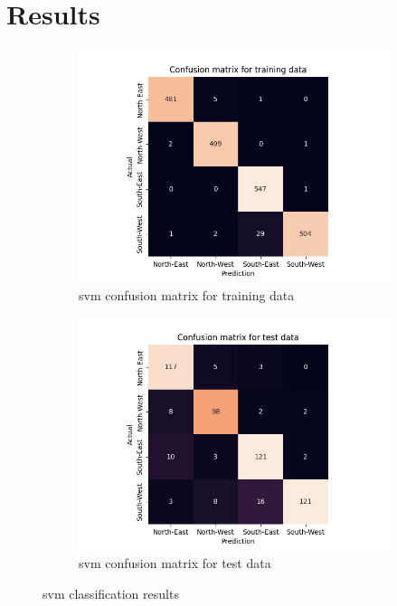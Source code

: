 \documentclass[10pt,twocolumn,letterpaper]{article}
\begin{document}
\section{Results}
\label{sec:results}

\begin{figure}
  \centering
  \begin{subfigure}{.33\linewidth}
    \includegraphics[width=\linewidth, trim={7em, 0em, 9em, 5em}, clip]{svm_cfsn_train}
    \caption{\acrshort{svm} confusion matrix for training data}
    \label{fig:svm_train}
  \end{subfigure}
  \begin{subfigure}{0.33\linewidth}
    \includegraphics[width=\linewidth, trim={7em, 0em, 9em, 5em}, clip]{svm_cfsn_test}
    \caption{\acrshort{svm} confusion matrix for test data}
    \label{fig:svm_test}
  \end{subfigure}
  \caption{\acrlong{svm} classification results}
  \label{fig:svm_res}
\end{figure}
\end{document}
